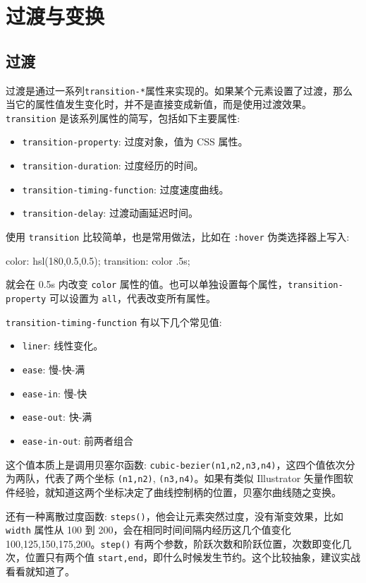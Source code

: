 \section{过渡与变换}

\subsection{过渡}

过渡是通过一系列\texttt{transition-*}属性来实现的。如果某个元素设置了过渡，那么当它的属性值发生变化时，并不是直接变成新值，而是使用过渡效果。\texttt{transition} 是该系列属性的简写，包括如下主要属性:
\begin{itemize}
    \item \texttt{transition-property}: 过度对象，值为 CSS 属性。
    \item \texttt{transition-duration}: 过度经历的时间。
    \item \texttt{transition-timing-function}: 过度速度曲线。
    \item \texttt{transition-delay}: 过渡动画延迟时间。
\end{itemize}

使用 \texttt{transition} 比较简单，也是常用做法，比如在 \texttt{:hover} 伪类选择器上写入:

\begin{HTML}
color: hsl(180,0.5,0.5);
transition: color .5s;
\end{HTML}

就会在 0.5s 内改变 \texttt{color} 属性的值。也可以单独设置每个属性，\texttt{transition-property} 可以设置为 \texttt{all}，代表改变所有属性。

\texttt{transition-timing-function} 有以下几个常见值:
\begin{itemize}
    \item \texttt{liner}: 线性变化。
    \item \texttt{ease}: 慢-快-满
    \item \texttt{ease-in}: 慢-快
    \item \texttt{ease-out}: 快-满
    \item \texttt{ease-in-out}: 前两者组合
\end{itemize}

这个值本质上是调用贝塞尔函数: \texttt{cubic-bezier(n1,n2,n3,n4)}，这四个值依次分为两队，代表了两个坐标 \texttt{(n1,n2)}, \texttt{(n3,n4)}。如果有类似 Illustrator 矢量作图软件经验，就知道这两个坐标决定了曲线控制柄的位置，贝塞尔曲线随之变换。

还有一种离散过度函数: \texttt{steps()}，他会让元素突然过度，没有渐变效果，比如 \texttt{width} 属性从 100 到 200，会在相同时间间隔内经历这几个值变化 100,125,150,175,200。\texttt{step()} 有两个参数，阶跃次数和阶跃位置，次数即变化几次，位置只有两个值 \texttt{start,end}，即什么时候发生节约。这个比较抽象，建议实战看看就知道了。

